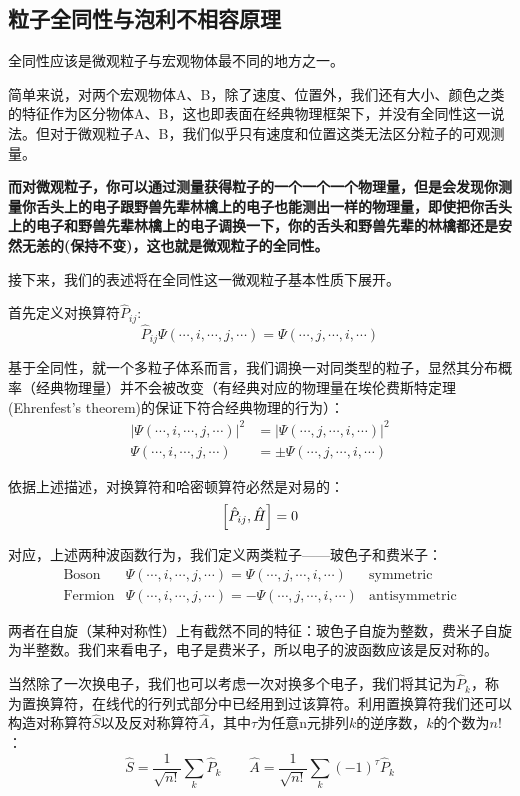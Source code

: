 \subsection{粒子全同性与泡利不相容原理}
全同性应该是微观粒子与宏观物体最不同的地方之一。

简单来说，对两个宏观物体A、B，除了速度、位置外，我们还有大小、颜色之类的特征作为区分物体A、B，这也即表面在经典物理框架下，并没有全同性这一说法。但对于微观粒子A、B，我们似乎只有速度和位置这类无法区分粒子的可观测量。

\textbf{而对微观粒子，你可以通过测量获得粒子的一个一个一个物理量，但是会发现你测量你舌头上的电子跟野兽先辈林檎上的电子也能测出一样的物理量，即使把你舌头上的电子和野兽先辈林檎上的电子调换一下，你的舌头和野兽先辈的林檎都还是安然无恙的(保持不变)，这也就是微观粒子的全同性。}

接下来，我们的表述将在全同性这一微观粒子基本性质下展开。

首先定义对换算符$\hat{P}_{ij}$:
\[\hat{P}_{ij}\varPsi(\cdots,i,\cdots,j,\cdots)=\varPsi(\cdots,j,\cdots,i,\cdots)\]

基于全同性，就一个多粒子体系而言，我们调换一对同类型的粒子，显然其分布概率（经典物理量）并不会被改变（有经典对应的物理量在埃伦费斯特定理(Ehrenfest's theorem)的保证下符合经典物理的行为）：
\[\begin{aligned}
|\varPsi(\cdots,i,\cdots,j,\cdots)|^2&=|\varPsi(\cdots,j,\cdots,i,\cdots)|^2 \\ 
\varPsi(\cdots,i,\cdots,j,\cdots)&=\pm\varPsi(\cdots,j,\cdots,i,\cdots)
\end{aligned}\]

依据上述描述，对换算符和哈密顿算符必然是对易的：
\[\qty[\hat{P}_{ij},\hat{H}]=0\]

对应，上述两种波函数行为，我们定义两类粒子——玻色子和费米子：
\[
    \begin{array}{lll}
        \text{Boson} & \varPsi(\cdots,i,\cdots,j,\cdots)=\varPsi(\cdots,j,\cdots,i,\cdots) & \text{symmetric} \\
        \text{Fermion} & \varPsi(\cdots,i,\cdots,j,\cdots)=-\varPsi(\cdots,j,\cdots,i,\cdots) & \text{antisymmetric}
    \end{array}
\]

两者在自旋（某种对称性）上有截然不同的特征：玻色子自旋为整数，费米子自旋为半整数。我们来看电子，电子是费米子，所以电子的波函数应该是反对称的。

当然除了一次换电子，我们也可以考虑一次对换多个电子，我们将其记为$\hat{P}_k$，称为置换算符，在线代的行列式部分中已经用到过该算符。利用置换算符我们还可以构造对称算符$\hat{S}$以及反对称算符$\hat{A}$，其中$\tau$为任意n元排列$k$的逆序数，$k$的个数为$n!$：
\[\hat{S}=\frac{1}{\sqrt{n!}}\sum_{k}\hat{P}_{k} \qquad \hat{A}=\frac{1}{\sqrt{n!}}\sum_{k}(-1)^{\tau}\hat{P}_{k}\]

